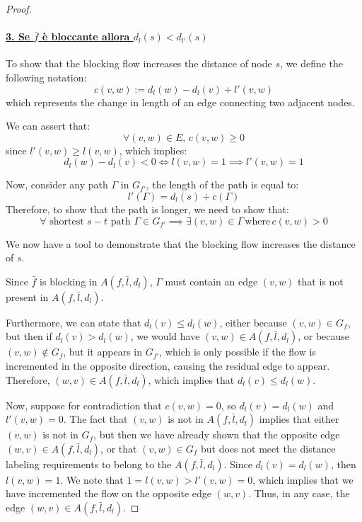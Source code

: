 \begin{proof}
        
            \paragraph*{\underline{3. Se $\bar{f}$ è bloccante allora $d_l(s) < d_{l'}(s)$}}

            To show that the blocking flow increases the distance of node \( s \), we define the following notation:
            \[
            c(v,w) := d_l(w) - d_l(v) + l'(v,w)
            \]
            which represents the change in length of an edge connecting two adjacent nodes.

            We can assert that:
            \[
            \forall (v,w) \in E, \, c(v,w) \ge 0
            \]
            since \( l'(v,w) \ge l(v,w) \), which implies:
            \[
            d_l(w) - d_l(v) < 0 \iff l(v,w) = 1 \implies l'(v,w) = 1
            \]

            Now, consider any path \( \Gamma \) in \( G_{f'} \), the length of the path is equal to:
            \[
            l'(\Gamma) = d_l(s) + c(\Gamma)
            \]
            Therefore, to show that the path is longer, we need to show that:
            \[
            \forall \text{ shortest } s-t \text{ path } \Gamma \in G_{f'} \implies \exists (v,w) \in \Gamma \, \text{where} \, c(v,w) > 0
            \]

            We now have a tool to demonstrate that the blocking flow increases the distance of $s$.

            

            Since \( \bar{f} \) is blocking in \( A(f,\bar{l}, d_l) \), \( \Gamma \) must contain an edge \( (v,w) \) that is not present in \( A(f,\bar{l}, d_l) \).
            
            Furthermore, we can state that \( d_l(v) \leq d_l(w) \), either because \( (v,w) \in G_f \), but then if \( d_l(v) > d_l(w) \), we would have \( (v,w) \in A(f,\bar{l}, d_l) \),  
            or because \( (v,w) \notin G_f \), but it appears in \( G_{f'} \), which is only possible if the flow is incremented in the opposite direction, causing the residual edge to appear. Therefore, \( (w,v) \in A(f,\bar{l}, d_l) \), which implies that \( d_l(v) \leq d_l(w) \).
            
            Now, suppose for contradiction that \( c(v,w) = 0 \), so \( d_l(v) = d_l(w) \) and \( l'(v,w) = 0 \).  
            The fact that \( (v,w) \) is not in \( A(f,\bar{l}, d_l) \) implies that either \( (v,w) \) is not in \( G_f \), but then we have already shown that the opposite edge \( (w,v) \in A(f,\bar{l}, d_l) \),  
            or that \( (v,w) \in G_f \) but does not meet the distance labeling requirements to belong to the  \( A(f,\bar{l}, d_l) \).  
            Since \( d_l(v) = d_l(w) \), then \( l(v,w) = 1 \). We note that \( 1 = l(v,w) > l'(v,w) = 0 \), which implies that we have incremented the flow on the opposite edge \( (w,v) \).  
            Thus, in any case, the edge \( (w,v) \in A(f,\bar{l}, d_l) \).
            

\end{proof}
